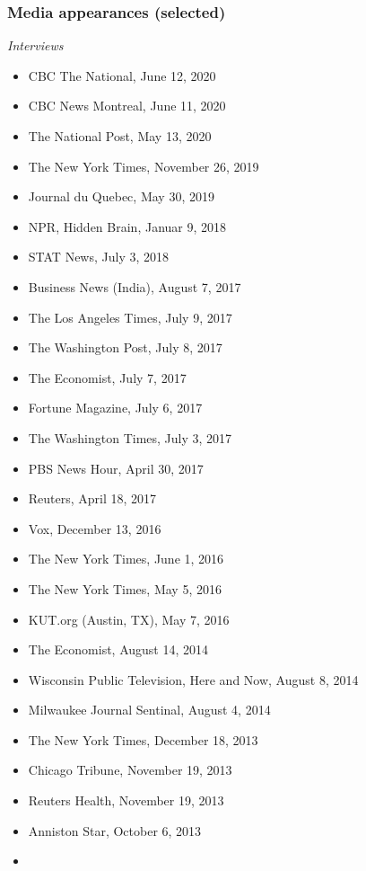 \documentclass[
  letterpaper,
  DIV=11,
  numbers=noendperiod]{scrartcl}
\providecommand{\tightlist}{%
  \setlength{\itemsep}{0pt}\setlength{\parskip}{0pt}}\usepackage{longtable,booktabs,array}
\begin{document}
\hypertarget{media-appearances-selected}{%
\subsubsection{Media appearances
(selected)}\label{media-appearances-selected}}

\emph{Interviews}

\begin{itemize}
\tightlist
\item
  CBC The National, June 12, 2020
\item
  CBC News Montreal, June 11, 2020
\item
  The National Post, May 13, 2020
\item
  The New York Times, November 26, 2019
\item
  Journal du Quebec, May 30, 2019
\item
  NPR, Hidden Brain, Januar 9, 2018
\item
  STAT News, July 3, 2018
\item
  Business News (India), August 7, 2017
\item
  The Los Angeles Times, July 9, 2017
\item
  The Washington Post, July 8, 2017
\item
  The Economist, July 7, 2017
\item
  Fortune Magazine, July 6, 2017
\item
  The Washington Times, July 3, 2017
\item
  PBS News Hour, April 30, 2017
\item
  Reuters, April 18, 2017
\item
  Vox, December 13, 2016
\item
  The New York Times, June 1, 2016
\item
  The New York Times, May 5, 2016
\item
  KUT.org (Austin, TX), May 7, 2016
\item
  The Economist, August 14, 2014
\item
  Wisconsin Public Television, Here and Now, August 8, 2014
\item
  Milwaukee Journal Sentinal, August 4, 2014
\item
  The New York Times, December 18, 2013
\item
  Chicago Tribune, November 19, 2013
\item
  Reuters Health, November 19, 2013
\item
  Anniston Star, October 6, 2013
\item

\end{itemize}
\end{document}
